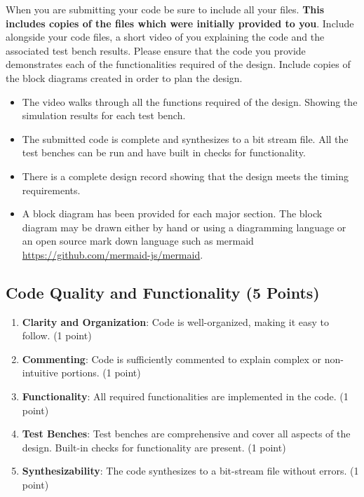 When you are submitting your code be sure to include all your files. \textbf{This includes copies of the files which were initially provided to you}. Include alongside your code files, a short video of you explaining the code and the associated test bench results. Please ensure that the code you provide demonstrates each of the functionalities required of the design. Include copies of the block diagrams created in order to plan the design. 

\begin{itemize}
    \item The video walks through all the functions required of the design. Showing the simulation results for each test bench.
    \item The submitted code is complete and synthesizes to a bit stream file. All the test benches can be run and have built in checks for functionality. 
    \item There is a complete design record showing that the design meets the timing requirements. 
    \item A block diagram has been provided for each major section. The block diagram may be drawn either by hand or using a diagramming language or an open source mark down language such as mermaid \url{https://github.com/mermaid-js/mermaid}. %
\end{itemize}

\subsection*{Code Quality and Functionality (5 Points)}

\begin{enumerate}
    \item \textbf{Clarity and Organization}: Code is well-organized, making it easy to follow. (1 point)
    \item \textbf{Commenting}: Code is sufficiently commented to explain complex or non-intuitive portions. (1 point)
    \item \textbf{Functionality}: All required functionalities are implemented in the code. (1 point)
    \item \textbf{Test Benches}: Test benches are comprehensive and cover all aspects of the design. Built-in checks for functionality are present. (1 point)
    \item \textbf{Synthesizability}: The code synthesizes to a bit-stream file without errors. (1 point)
\end{enumerate}

